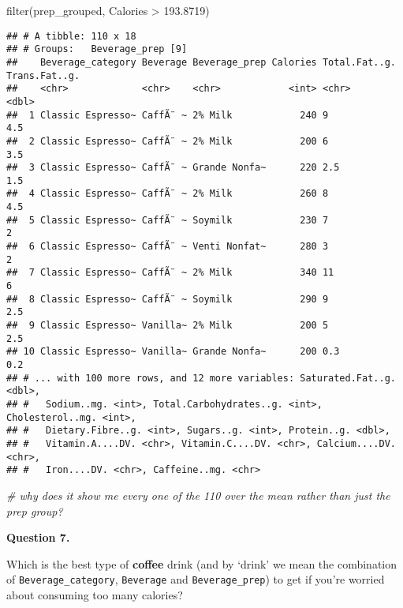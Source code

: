 \documentclass[
]{article}
\newenvironment{Shaded}{\begin{snugshade}}{\end{snugshade}}
\newcommand{\CommentTok}[1]{\textcolor[rgb]{0.56,0.35,0.01}{\textit{#1}}}
\newcommand{\FloatTok}[1]{\textcolor[rgb]{0.00,0.00,0.81}{#1}}
\newcommand{\FunctionTok}[1]{\textcolor[rgb]{0.00,0.00,0.00}{#1}}
\newcommand{\NormalTok}[1]{#1}
\newcommand{\SpecialCharTok}[1]{\textcolor[rgb]{0.00,0.00,0.00}{#1}}
\begin{document}
\begin{Shaded}
\begin{Highlighting}[]
\FunctionTok{filter}\NormalTok{(prep\_grouped, Calories }\SpecialCharTok{\textgreater{}} \FloatTok{193.8719}\NormalTok{)}
\end{Highlighting}
\end{Shaded}

\begin{verbatim}
## # A tibble: 110 x 18
## # Groups:   Beverage_prep [9]
##    Beverage_category Beverage Beverage_prep Calories Total.Fat..g. Trans.Fat..g.
##    <chr>             <chr>    <chr>            <int> <chr>                 <dbl>
##  1 Classic Espresso~ CaffÃ¨ ~ 2% Milk            240 9                       4.5
##  2 Classic Espresso~ CaffÃ¨ ~ 2% Milk            200 6                       3.5
##  3 Classic Espresso~ CaffÃ¨ ~ Grande Nonfa~      220 2.5                     1.5
##  4 Classic Espresso~ CaffÃ¨ ~ 2% Milk            260 8                       4.5
##  5 Classic Espresso~ CaffÃ¨ ~ Soymilk            230 7                       2  
##  6 Classic Espresso~ CaffÃ¨ ~ Venti Nonfat~      280 3                       2  
##  7 Classic Espresso~ CaffÃ¨ ~ 2% Milk            340 11                      6  
##  8 Classic Espresso~ CaffÃ¨ ~ Soymilk            290 9                       2.5
##  9 Classic Espresso~ Vanilla~ 2% Milk            200 5                       2.5
## 10 Classic Espresso~ Vanilla~ Grande Nonfa~      200 0.3                     0.2
## # ... with 100 more rows, and 12 more variables: Saturated.Fat..g. <dbl>,
## #   Sodium..mg. <int>, Total.Carbohydrates..g. <int>, Cholesterol..mg. <int>,
## #   Dietary.Fibre..g. <int>, Sugars..g. <int>, Protein..g. <dbl>,
## #   Vitamin.A....DV. <chr>, Vitamin.C....DV. <chr>, Calcium....DV. <chr>,
## #   Iron....DV. <chr>, Caffeine..mg. <chr>
\end{verbatim}

\begin{Shaded}
\begin{Highlighting}[]
\CommentTok{\# why does it show me every one of the 110 over the mean rather than just the prep group?}
\end{Highlighting}
\end{Shaded}

\textbf{Question 7.}

Which is the best type of \textbf{coffee} drink (and by `drink' we mean
the combination of \texttt{Beverage\_category}, \texttt{Beverage} and
\texttt{Beverage\_prep}) to get if you're worried about consuming too
many calories?
\end{document}
